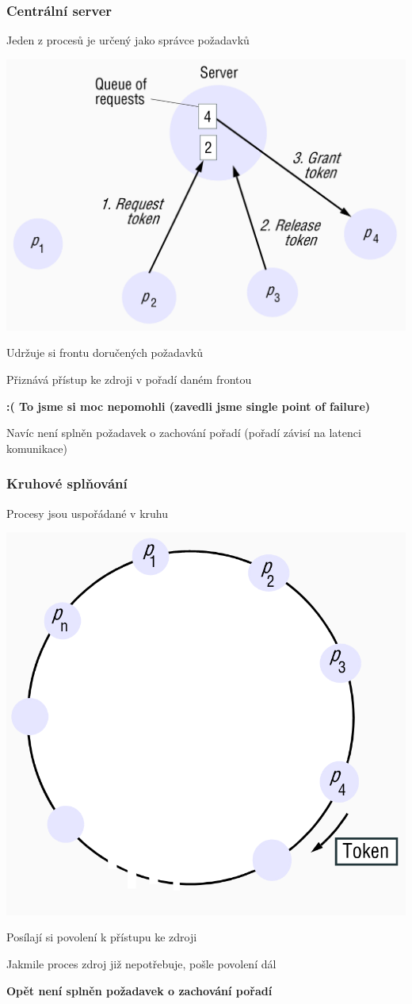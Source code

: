 \documentclass[usenames,dvipsnames,9pt]{beamer}
\begin{document}
\begin{frame}
\frametitle{Centrální server}

Jeden z procesů je určený jako správce požadavků

\begin{center}
\includegraphics[width=.5\linewidth]{11/figs/central.png}
\end{center}

Udržuje si frontu doručených požadavků

Přiznává přístup ke zdroji v pořadí daném frontou

\pause\vspace{1em}

\hfill\small\bf\textcolor{BrickRed}{:(} To jsme si moc nepomohli (zavedli jsme single point of failure)

\hfill Navíc není splněn požadavek o zachování pořadí (pořadí závisí na latenci komunikace)


\end{frame}

\begin{frame}
\frametitle{Kruhové splňování}

Procesy jsou uspořádané v kruhu

\begin{center}
\includegraphics[width=.35\linewidth]{11/figs/circle.png}
\end{center}

Posílají si povolení k přístupu ke zdroji

Jakmile proces zdroj již nepotřebuje, pošle povolení dál

\vspace{1em}

\hfill\small\bf Opět není splněn požadavek o zachování pořadí


\end{frame}
\end{document}
